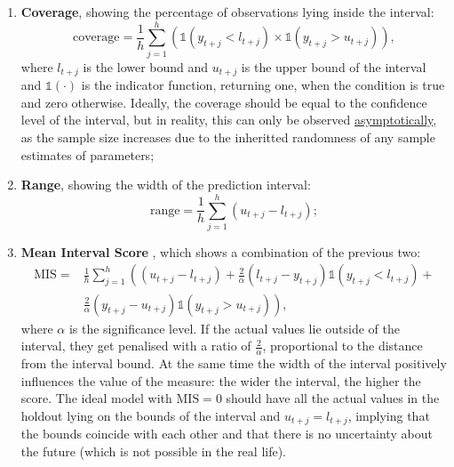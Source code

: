 \documentclass[
]{book}
\providecommand{\tightlist}{%
  \setlength{\itemsep}{0pt}\setlength{\parskip}{0pt}}
\theoremstyle{definition}
\theoremstyle{definition}
\theoremstyle{definition}
\theoremstyle{definition}
\theoremstyle{remark}
\begin{document}
\begin{enumerate}
\def\labelenumi{\arabic{enumi}.}
\tightlist
\item
  \textbf{Coverage}, showing the percentage of observations lying inside the interval:
  \begin{equation}
   \mathrm{coverage} = \frac{1}{h} \sum_{j=1}^h \left( \mathbb{1}(y_{t+j} < l_{t+j}) \times \mathbb{1}(y_{t+j} > u_{t+j}) \right),
   \label{eq:coverage}
  \end{equation}
  where \(l_{t+j}\) is the lower bound and \(u_{t+j}\) is the upper bound of the interval and \(\mathbb{1}(\cdot)\) is the indicator function, returning one, when the condition is true and zero otherwise. Ideally, the coverage should be equal to the confidence level of the interval, but in reality, this can only be observed \protect\hyperlink{estimatesProperties}{asymptotically}, as the sample size increases due to the inheritted randomness of any sample estimates of parameters;
\item
  \textbf{Range}, showing the width of the prediction interval:
  \begin{equation}
   \mathrm{range} = \frac{1}{h} \sum_{j=1}^h (u_{t+j} -l_{t+j});
   \label{eq:range}
  \end{equation}
\item
  \textbf{Mean Interval Score} \citep{Gneiting2007}, which shows a combination of the previous two:
  \begin{equation}
   \begin{aligned}
   \mathrm{MIS} = & \frac{1}{h} \sum_{j=1}^h \left( (u_{t+j} -l_{t+j}) + \frac{2}{\alpha} (l_{t+j} -y_{t+j}) \mathbb{1}(y_{t+j} < l_{t+j}) +\right. \\
   & \left. \frac{2}{\alpha} (y_{t+j} -u_{t+j}) \mathbb{1}(y_{t+j} > u_{t+j}) \right) ,
   \end{aligned}
   \label{eq:MIS}
  \end{equation}
  where \(\alpha\) is the significance level. If the actual values lie outside of the interval, they get penalised with a ratio of \(\frac{2}{\alpha}\), proportional to the distance from the interval bound. At the same time the width of the interval positively influences the value of the measure: the wider the interval, the higher the score. The ideal model with \(\mathrm{MIS}=0\) should have all the actual values in the holdout lying on the bounds of the interval and \(u_{t+j}=l_{t+j}\), implying that the bounds coincide with each other and that there is no uncertainty about the future (which is not possible in the real life).

\end{enumerate}
\end{document}
